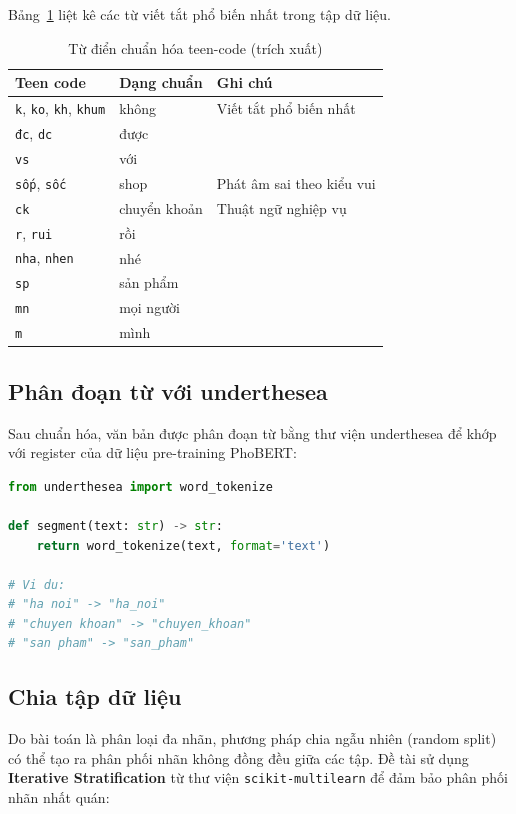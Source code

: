 \documentclass[12pt, a4paper]{report}
\begin{document}
Bảng~\ref{tab:teencode} liệt kê các từ viết tắt phổ biến nhất trong tập dữ liệu.

\begin{table}[H]
\centering
\caption{Từ điển chuẩn hóa teen-code (trích xuất)}
\label{tab:teencode}
\begin{tabular}{lll}
\toprule
\textbf{Teen code} & \textbf{Dạng chuẩn} & \textbf{Ghi chú} \\
\midrule
\texttt{k}, \texttt{ko}, \texttt{kh}, \texttt{khum} & không & Viết tắt phổ biến nhất \\
\texttt{đc}, \texttt{dc} & được & \\
\texttt{vs} & với & \\
\texttt{sốp}, \texttt{sốc} & shop & Phát âm sai theo kiểu vui \\
\texttt{ck} & chuyển khoản & Thuật ngữ nghiệp vụ \\
\texttt{r}, \texttt{rui} & rồi & \\
\texttt{nha}, \texttt{nhen} & nhé & \\
\texttt{sp} & sản phẩm & \\
\texttt{mn} & mọi người & \\
\texttt{m} & mình & \\
\bottomrule
\end{tabular}
\end{table}

\subsection{Phân đoạn từ với underthesea}

Sau chuẩn hóa, văn bản được phân đoạn từ bằng thư viện underthesea
để khớp với register của dữ liệu pre-training PhoBERT:

\begin{lstlisting}[language=Python, caption={Phân đoạn từ với underthesea}]
from underthesea import word_tokenize

def segment(text: str) -> str:
    return word_tokenize(text, format='text')

# Vi du:
# "ha noi" -> "ha_noi"
# "chuyen khoan" -> "chuyen_khoan"
# "san pham" -> "san_pham"
\end{lstlisting}

\subsection{Chia tập dữ liệu}

Do bài toán là phân loại đa nhãn, phương pháp chia ngẫu nhiên
(random split) có thể tạo ra phân phối nhãn không đồng đều
giữa các tập. Đề tài sử dụng \textbf{Iterative Stratification}
\cite{sechidis2011stratification} từ thư viện \texttt{scikit-multilearn}
để đảm bảo phân phối nhãn nhất quán:
\end{document}
